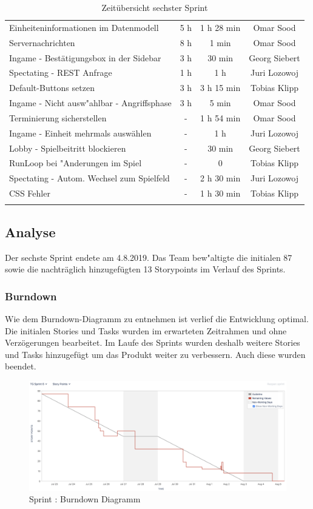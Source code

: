 \documentclass[12pt, titlepage]{scrartcl}
\newcommand{\RN}[1]{%
	\textup{\uppercase\expandafter{\romannumeral#1}}%
}
\begin{document}
\begin{longtable}[H]{p{9cm} c c c }
    			Einheiteninformationen im Datenmodell & 5 h & 1 h 28 min & Omar Sood \\
    			Servernachrichten & 8 h & 1 min & Omar Sood \\
    			Ingame - Best\"atigungsbox in der Sidebar & 3 h & 30 min & Georg Siebert \\
    			Spectating - REST Anfrage & 1 h & 1 h & Juri Lozowoj \\
    			Default-Buttons setzen & 3 h & 3 h 15 min & Tobias Klipp \\
    			Ingame - Nicht ausw"ahlbar - Angriffsphase & 3 h & 5 min & Omar Sood \\
    			\midrule
    			Terminierung sicherstellen & - & 1 h 54 min & Omar Sood \\
    			Ingame - Einheit mehrmals ausw\"ahlen & - & 1 h & Juri Lozowoj \\
    			Lobby - Spielbeitritt blockieren & - & 30 min & Georg Siebert \\
    			RunLoop bei "Anderungen im Spiel & - & 0 & Tobias Klipp \\
    			Spectating - Autom. Wechsel zum Spielfeld & - & 2 h 30 min & Juri Lozowoj \\
    			CSS Fehler & - & 1 h 30 min & Tobias Klipp \\
    			\caption{Zeit\"ubersicht sechster Sprint}
    		\end{longtable}
    	\subsection{Analyse}
    		Der sechste Sprint endete am 4.8.2019. Das Team bew"altigte die initialen 87 sowie die nachtr\"aglich hinzugef\"ugten 13 Storypoints im Verlauf des Sprints.
	    	\subsubsection{Burndown}
	    		Wie dem Burndown-Diagramm zu entnehmen ist verlief die Entwicklung optimal. Die initialen Stories und Tasks wurden im erwarteten Zeitrahmen und ohne Verz\"ogerungen bearbeitet. Im Laufe des Sprints wurden deshalb weitere Stories und Tasks hinzugef\"ugt um das Produkt weiter zu verbessern. Auch diese wurden beendet.
	    		\begin{figure}[H] 
	    			\centering
	    			\includegraphics[width=\textwidth]{images/sprintVI/burndown.png}
	    			\caption{Sprint \RN{6}: Burndown Diagramm}
	    			\label{Burndown_6}
	    		\end{figure}
\end{document}
